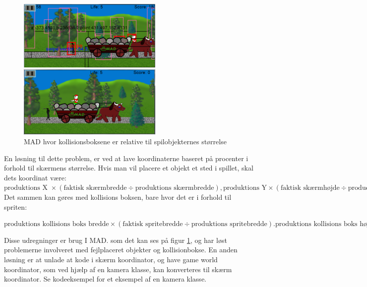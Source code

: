\documentclass[Main.tex]{PositionOgSkalering}
\begin{document}
\begin{figure}[h]
\centering
\parbox{7cm}{   
\includegraphics[width = 7cm]{billeder/MADscaling5}
\caption{MAD hvor kollisionsboksene ikke er relative til spilobjekternes størrelse}    
\label{MADscaling5}}
\qquad
\begin{minipage}{7cm}
\includegraphics[width = 7cm]{billeder/MADscaling6}
\caption{MAD hvor kollisionsboksene er relative til spilobjekternes størrelse}    
\label{MADscaling6}
\end{minipage}
\end{figure}

En løsning til dette problem, er ved at lave koordinaterne baseret på procenter i forhold til skærmens størrelse. Hvis man vil placere et objekt et sted i spillet, skal dets koordinat være:
\begin{math}
\text{produktions X } \times (\text{faktisk skærmbredde} \div \text{produktions skærmbredde}),
\text{produktions Y} \times (\text{faktisk skærmhøjde} \div \text{productions skærmhøjde})\end{math}
Det sammen kan gøres med kollisions boksen, bare hvor det er i forhold til spriten:

\begin{math}
\text{produktions kollisions boks bredde} \times (\text{faktisk spritebredde} \div \text{produktions spritebredde}).
\text{produktions kollisions boks højde} \times (\text{faktisk spritehøjde} \div \text{produktions spritehøjde}).  \end{math}

Disse udregninger er brug I MAD. som det kan ses på figur \ref{MADscaling6}, og har løst problemerne involveret med fejlplaceret objekter og kollisionbokse.
En anden løsning er at unlade at kode i skærm koordinator, og have game world koordinator, som ved hjælp af en kamera klasse, kan konverteres til skærm koordinator. Se kodeeksempel for et eksempel af en kamera klasse.
\end{document}
